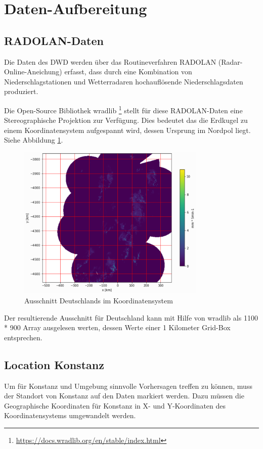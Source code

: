 \section{Daten-Aufbereitung}

\subsection{RADOLAN-Daten}

Die Daten des DWD werden über das Routineverfahren RADOLAN (Radar-Online-Aneichung) erfasst, dass durch eine Kombination von Niederschlagstationen und Wetterradaren hochauflösende Niederschlagsdaten produziert. 

Die Open-Source Bibliothek wradlib \footnote{\url{https://docs.wradlib.org/en/stable/index.html}} stellt für diese RADOLAN-Daten eine Stereographische Projektion zur Verfügung. Dies bedeutet das die Erdkugel zu einem Koordinatensystem aufgespannt wird, dessen Ursprung im Nordpol liegt. Siehe Abbildung  \ref{rz}.

\begin{figure}[H]
	\centering
	\includegraphics[width=0.8\textwidth]{pics/RZ_product.PNG}
	\caption{Ausschnitt Deutschlands im Koordinatensystem}
	\label{rz}
\end{figure}

Der resultierende Ausschnitt für Deutschland kann mit Hilfe von wradlib als 1100 * 900 Array ausgelesen werten, dessen Werte einer 1 Kilometer Grid-Box entsprechen.

\subsection{Location Konstanz}
Um für Konstanz und Umgebung sinnvolle Vorhersagen treffen zu können, muss der Standort von Konstanz auf den Daten markiert werden. Dazu müssen die Geographische Koordinaten für Konstanz in X- und Y-Koordinaten des Koordinatensystems umgewandelt werden. 

